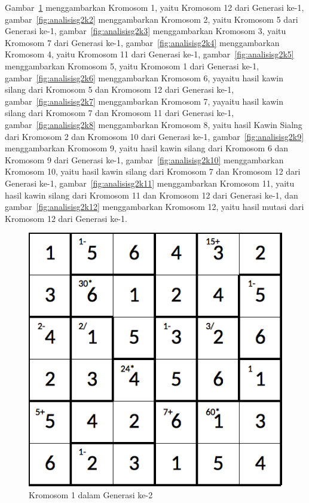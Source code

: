 \documentclass[a4paper,twoside]{article}
\begin{document}
\begin{enumerate}
Gambar~\ref{fig:analisisg2k1} menggambarkan Kromosom 1, yaitu Kromosom 12 dari Generasi ke-1, gambar~\ref{fig:analisisg2k2} menggambarkan Kromosom 2, yaitu Kromosom 5 dari Generasi ke-1, gambar~\ref{fig:analisisg2k3} menggambarkan Kromosom 3, yaitu Kromosom 7 dari Generasi ke-1, gambar~\ref{fig:analisisg2k4} menggambarkan Kromosom 4, yaitu Kromosom 11 dari Generasi ke-1, gambar~\ref{fig:analisisg2k5} menggambarkan Kromosom 5, yaitu Kromosom 1 dari Generasi ke-1, gambar~\ref{fig:analisisg2k6} menggambarkan Kromosom 6, yayaitu hasil kawin silang dari Kromosom 5 dan Kromosom 12 dari Generasi ke-1, gambar~\ref{fig:analisisg2k7} menggambarkan Kromosom 7, yayaitu hasil kawin silang dari Kromosom 7 dan Kromosom 11 dari Generasi ke-1, gambar~\ref{fig:analisisg2k8} menggambarkan Kromosom 8, yaitu hasil Kawin Sialng dari Kromosom 2 dan Kromosom 10 dari Generasi ke-1, gambar~\ref{fig:analisisg2k9} menggambarkan Kromosom 9, yaitu hasil kawin silang dari Kromosom 6 dan Kromosom 9 dari Generasi ke-1, gambar~\ref{fig:analisisg2k10} menggambarkan Kromosom 10, yaitu hasil kawin silang dari Kromosom 7 dan Kromosom 12 dari Generasi ke-1, gambar~\ref{fig:analisisg2k11} menggambarkan Kromosom 11, yaitu hasil kawin silang dari Kromosom 11 dan Kromosom 12 dari Generasi ke-1, dan gambar~\ref{fig:analisisg2k12} menggambarkan Kromosom 12, yaitu hasil mutasi dari Kromosom 12 dari Generasi ke-1.

\clearpage

\begin{figure}
\centering
\captionsetup{justification=centering}
\includegraphics[scale=0.333]{Gambar/hybridgenetic/Generation2Chromosome1}
\caption[Kromosom 1 dalam Generasi ke-2]{Kromosom 1 dalam Generasi ke-2}
\label{fig:analisisg2k1}
\end{figure}


\end{enumerate}
\end{document}
